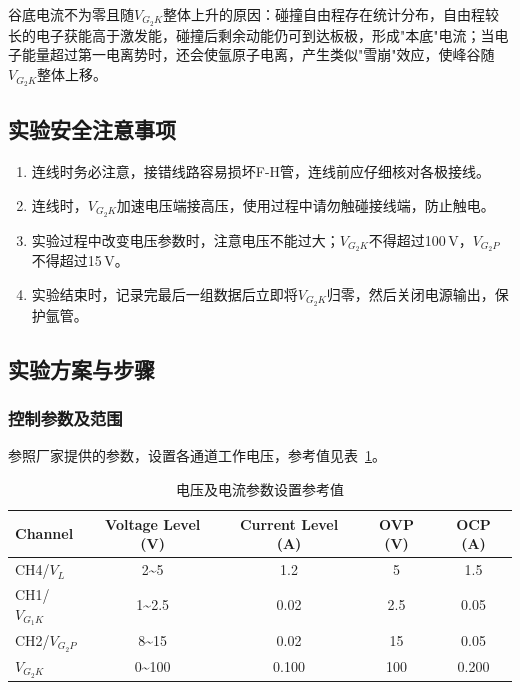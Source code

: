 \documentclass[dvipsnames, svgnames,a4paper,11pt]{article}
\begin{document}
谷底电流不为零且随$V_{G_2K}$整体上升的原因：碰撞自由程存在统计分布，自由程较长的电子获能高于激发能，碰撞后剩余动能仍可到达板极，形成"本底"电流；当电子能量超过第一电离势时，还会使氩原子电离，产生类似"雪崩"效应，使峰谷随$V_{G_2K}$整体上移。

\subsection{实验安全注意事项}
\begin{enumerate}
	\item 连线时务必注意，接错线路容易损坏F-H管，连线前应仔细核对各极接线。
	\item 连线时，$V_{G_2K}$加速电压端接高压，使用过程中请勿触碰接线端，防止触电。
	\item 实验过程中改变电压参数时，注意电压不能过大；$V_{G_2K}$不得超过100\,V，$V_{G_2P}$不得超过15\,V。
	\item 实验结束时，记录完最后一组数据后立即将$V_{G_2K}$归零，然后关闭电源输出，保护氩管。
\end{enumerate}

\subsection{实验方案与步骤}

\subsubsection{控制参数及范围}

参照厂家提供的参数，设置各通道工作电压，参考值见表~\ref{tab:params}。

\begin{table}[htbp]
	\centering
	\caption{电压及电流参数设置参考值}
	\label{tab:params}
	\renewcommand\arraystretch{1.5}
	\begin{tabular}{lcccc}
	\toprule
	Channel & Voltage Level (V) & Current Level (A) & OVP (V) & OCP (A) \\
	\midrule
	CH4/$V_L$       & 2\textasciitilde5   & 1.2   & 5   & 1.5   \\
	CH1/$V_{G_1K}$  & 1\textasciitilde2.5 & 0.02  & 2.5 & 0.05  \\
	CH2/$V_{G_2P}$  & 8\textasciitilde15  & 0.02  & 15  & 0.05  \\
	$V_{G_2K}$      & 0\textasciitilde100 & 0.100 & 100 & 0.200 \\
	\bottomrule
	\end{tabular}
\end{table}
\end{document}
